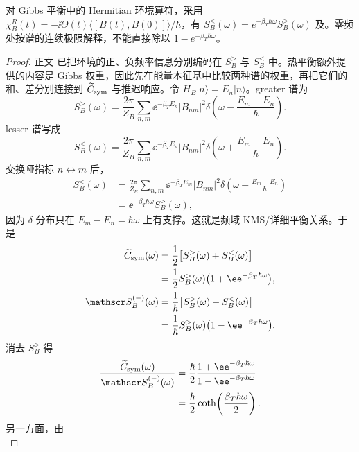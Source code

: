 \begin{proposition}[热谱的和差与涨落耗散恒等式]
对 Gibbs 平衡中的 Hermitian 环境算符，采用 $\chi_B^R(t)=-\ii\Theta(t)\langle[B(t),B(0)]\rangle/\hbar$，有 $S_B^<(\omega)=e^{-\beta_T\hbar\omega}S_B^>(\omega)$ 及。零频处按谱的连续极限解释，不能直接除以 $1-e^{-\beta_T\hbar\omega}$。
\end{proposition}
\begin{proof}
正文 已把环境的正、负频率信息分别编码在 $S_B^>$ 与 $S_B^<$ 中。热平衡额外提供的内容是 Gibbs 权重，因此先在能量本征基中比较两种谱的权重，再把它们的和、差分别连接到 $\widetilde C_{\rm sym}$ 与推迟响应。令 $H_B|n\rangle=E_n|n\rangle$。greater 谱为
\begin{equation*}
S_B^>(\omega)
=\frac{2\pi}{Z_B}\sum_{n,m}\ee^{-\beta_TE_n}|B_{nm}|^2
\delta\!\left(\omega-\frac{E_m-E_n}{\hbar}\right).
\end{equation*}
lesser 谱写成
\begin{equation*}
S_B^<(\omega)
=\frac{2\pi}{Z_B}\sum_{n,m}\ee^{-\beta_TE_n}|B_{nm}|^2
\delta\!\left(\omega+\frac{E_m-E_n}{\hbar}\right).
\end{equation*}
交换哑指标 $n\leftrightarrow m$ 后，
\begin{align*}
S_B^<(\omega)
&=\frac{2\pi}{Z_B}\sum_{n,m}\ee^{-\beta_TE_m}|B_{nm}|^2
\delta\!\left(\omega-\frac{E_m-E_n}{\hbar}\right)\\
&=\ee^{-\beta_T\hbar\omega}S_B^>(\omega),
\end{align*}
因为 $\delta$ 分布只在 $E_m-E_n=\hbar\omega$ 上有支撑。这就是频域 KMS/详细平衡关系。于是
\begin{align*}
\widetilde C_{\rm sym}(\omega)
&=\frac12\big[S_B^>(\omega)+S_B^<(\omega)\big]\\
&=\frac12S_B^>(\omega)\big(1+\ee^{-\beta_T\hbar\omega}\big),\\
\mathscr S_B^{(-)}(\omega)
&=\frac1\hbar\big[S_B^>(\omega)-S_B^<(\omega)\big]\\
&=\frac1\hbar S_B^>(\omega)\big(1-\ee^{-\beta_T\hbar\omega}\big).
\end{align*}
消去 $S_B^>$ 得
\begin{align*}
\frac{\widetilde C_{\rm sym}(\omega)}{\mathscr S_B^{(-)}(\omega)}
&=\frac{\hbar}{2}
\frac{1+\ee^{-\beta_T\hbar\omega}}{1-\ee^{-\beta_T\hbar\omega}}\\
&=\frac{\hbar}{2}\coth\!\left(\frac{\beta_T\hbar\omega}{2}\right).
\end{align*}
另一方面，由
\begin{equation*}

\end{equation*}
\end{proof}
